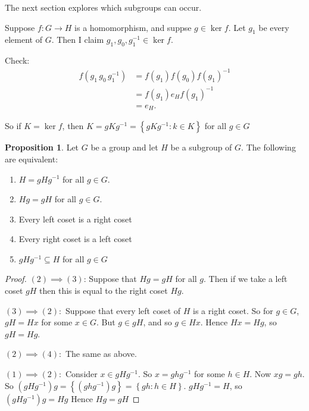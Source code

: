 \documentclass{article}
\theoremstyle{definition}
\newtheorem{proposition}{Proposition}
\newcommand{\func}[3]{#1 : #2 \rightarrow #3}
\begin{document}
The next section explores which subgroups can occur.

Suppose $\func{f}{G}{H}$ is a homomorphism, and suppse $g \in \ker f$. Let $g_1$ be every element of $G$. Then I claim $g_1,g_0,g_1^{-1}\in \ker f$.

Check: 
\begin{align*}
  f(g_1\,g_0\,g_1^{-1}) &= f(g_1)f(g_0)f(g_1)^{-1}\\
  &= f(g_1)e_Hf(g_1)^{-1} \\
  &= e_H.
\end{align*}

So if $K=\ker f$, then $K=gKg^{-1}=\left\{ gKg^{-1} : k \in K \right\}$ for all $g \in G$

\begin{proposition}
  Let $G$ be a group and let $H$ be a subgroup of $G$. The following are equivalent:
  \begin{enumerate}
    \item $H=gHg^{-1}$ for all $g \in G$.
    \item $Hg=gH$ for all $g \in G$.
    \item Every left coset is a right coset
    \item Every right coset is a left coset
    \item $gHg^{-1} \subseteq H$ for all $g \in G$
  \end{enumerate}
\end{proposition}

\begin{proof}
  $(2) \implies (3)$: Suppose that $Hg=gH$ for all $g$. Then if we take a left coset $gH$ then this is equal to the right coset $Hg$.

  $(3)\implies(2):$ Suppose that every left coset of $H$ is a right coset. So for $g \in G$, $gH=Hx$ for some $x \in G$. But $g \in gH$, and so $g \in Hx$. Hence $Hx=Hg$, so $gH=Hg$.

  $(2)\implies(4):$ The same as above.

  $(1)\implies(2):$ 
  Consider $x \in gHg^{-1}$. So $x=ghg^{-1}$ for some $h \in H$. Now $xg=gh$. So $(gHg^{-1})g=\left\{ (ghg^{-1}) g \right\}=\left\{ gh : h \in H \right\}. $ $gHg^{-1}=H$, so $(gHg^{-1})g=Hg$ Hence $Hg = gH$
\end{proof}
\end{document}

